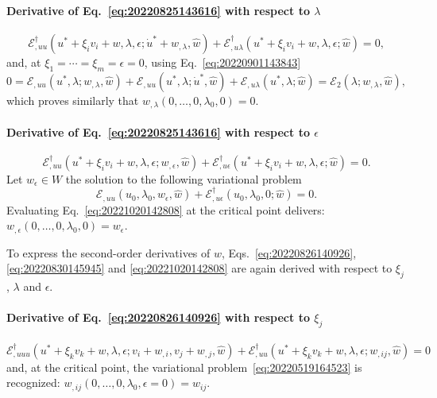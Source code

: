 \documentclass[12pt, final]{scrartcl}
\theoremstyle{definition}
\newcommand{\E}{\mathcal E}
\newcommand{\EE}{\mathcal E ^ \dagger}
\begin{document}
\paragraph{Derivative of Eq.~\eqref{eq:20220825143616} with respect to $\lambda$}
\begin{equation}
  \label{eq:20220830145945}
  \EE_{,uu}(u^\ast + \xi_i v_i + w, \lambda, \epsilon; \dot{u}^\ast + w_{,\lambda}, \hat{w}) + \EE_{,u\lambda}(u^\ast + \xi_i v_i + w, \lambda, \epsilon; \hat{w}) = 0,
\end{equation}
and, at \(\xi_1 = \cdots = \xi_m = \epsilon = 0\), using Eq.~\eqref{eq:20220901143843}
\begin{equation}
  \label{eq:20220830151513}
  0 = \E_{,uu}(u^\ast, \lambda; w_{,\lambda}, \hat{w})
  + \E_{,uu}(u^\ast, \lambda; \dot{u}^\ast, \hat{w}) + \E_{,u\lambda}(u^\ast, \lambda; \hat{w})
  = \E_2(\lambda; w_{,\lambda}, \hat{w}),
\end{equation}
which proves similarly that \(w_{,\lambda}(0, \ldots, 0, \lambda_0, 0) = 0\).

\paragraph{Derivative of Eq.~\eqref{eq:20220825143616} with respect to $\epsilon$}
\begin{equation}
  \label{eq:20221020142808}
  \EE_{,uu}(u^\ast + \xi_i v_i + w, \lambda, \epsilon; w_{,\epsilon}, \hat{w}) + \EE_{,u\epsilon}(u^\ast + \xi_i v_i + w, \lambda, \epsilon; \hat{w}) = 0.
\end{equation}
Let \(w_\epsilon \in W\) the solution to the following variational problem
\begin{equation}
    \label{eq:20221030175016}
    \E_{,uu}(u_0, \lambda_0, w_\epsilon, \hat{w}) + \EE_{,u\epsilon}(u_0, \lambda_0, 0; \hat{w}) = 0.
\end{equation}
Evaluating Eq.~\eqref{eq:20221020142808} at the critical point delivers: \(w_{,\epsilon}(0, \ldots, 0, \lambda_0, 0) = w_\epsilon\).

\bigskip

To express the second-order derivatives of $w$, Eqs.~\eqref{eq:20220826140926}, \eqref{eq:20220830145945} and
\eqref{eq:20221020142808} are again derived with respect to $\xi_j$, $\lambda$ and \(\epsilon\).

\bigskip

\paragraph{Derivative of Eq.~\eqref{eq:20220826140926} with respect to \(\xi_j\)}
\begin{equation}
  \EE_{,uuu}(u^\ast + \xi_k v_k + w, \lambda, \epsilon; v_i + w_{,i}, v_j + w_{,j}, \hat{w}) + \EE_{,uu}(u^\ast + \xi_k v_k + w, \lambda, \epsilon; w_{,ij}, \hat{w}) = 0
\end{equation}
and, at the critical point, the variational problem~\eqref{eq:20220519164523} is recognized:
\(w_{,ij}(0, \ldots, 0, \lambda_0, \epsilon = 0) = w_{ij}\).
\end{document}
